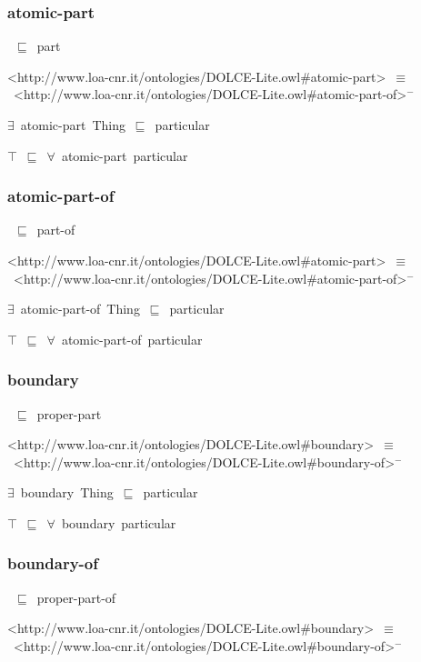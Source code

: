 \documentclass{article}
\begin{document}
\subsubsection*{atomic-part}

~\ensuremath{\sqsubseteq}~part

<http://www.loa-cnr.it/ontologies/DOLCE-Lite.owl#atomic-part>~\ensuremath{\equiv}~<http://www.loa-cnr.it/ontologies/DOLCE-Lite.owl#atomic-part-of>\ensuremath{^-}

\ensuremath{\exists}~atomic-part~Thing~\ensuremath{\sqsubseteq}~particular

\ensuremath{\top}~\ensuremath{\sqsubseteq}~\ensuremath{\forall}~atomic-part~particular

\subsubsection*{atomic-part-of}

~\ensuremath{\sqsubseteq}~part-of

<http://www.loa-cnr.it/ontologies/DOLCE-Lite.owl#atomic-part>~\ensuremath{\equiv}~<http://www.loa-cnr.it/ontologies/DOLCE-Lite.owl#atomic-part-of>\ensuremath{^-}

\ensuremath{\exists}~atomic-part-of~Thing~\ensuremath{\sqsubseteq}~particular

\ensuremath{\top}~\ensuremath{\sqsubseteq}~\ensuremath{\forall}~atomic-part-of~particular

\subsubsection*{boundary}

~\ensuremath{\sqsubseteq}~proper-part

<http://www.loa-cnr.it/ontologies/DOLCE-Lite.owl#boundary>~\ensuremath{\equiv}~<http://www.loa-cnr.it/ontologies/DOLCE-Lite.owl#boundary-of>\ensuremath{^-}

\ensuremath{\exists}~boundary~Thing~\ensuremath{\sqsubseteq}~particular

\ensuremath{\top}~\ensuremath{\sqsubseteq}~\ensuremath{\forall}~boundary~particular

\subsubsection*{boundary-of}

~\ensuremath{\sqsubseteq}~proper-part-of

<http://www.loa-cnr.it/ontologies/DOLCE-Lite.owl#boundary>~\ensuremath{\equiv}~<http://www.loa-cnr.it/ontologies/DOLCE-Lite.owl#boundary-of>\ensuremath{^-}
\end{document}
